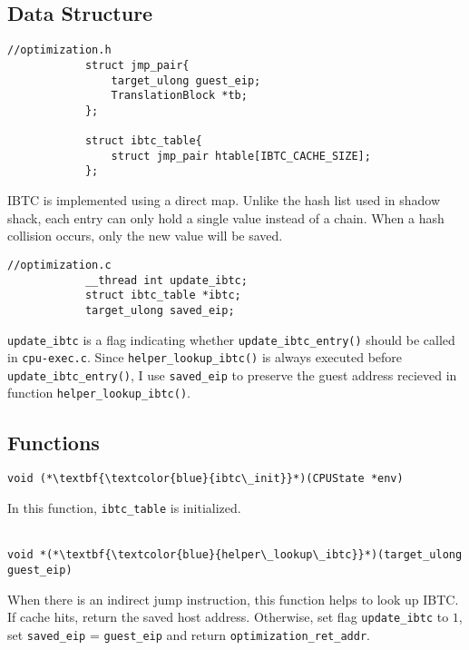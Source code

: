 \documentclass[12pt]{article}
\begin{document}
    \subsection{Data Structure}
        \begin{lstlisting}[style=Structure]
            //optimization.h
            struct jmp_pair{
                target_ulong guest_eip;
                TranslationBlock *tb;
            };

            struct ibtc_table{
                struct jmp_pair htable[IBTC_CACHE_SIZE];
            };
        \end{lstlisting}
        IBTC is implemented using a direct map.
        Unlike the hash list used in shadow shack, each entry can only hold a single value instead of a chain.
        When a hash collision occurs, only the new value will be saved.
        \\
        \begin{lstlisting}[style=Structure]
            //optimization.c
            __thread int update_ibtc;
            struct ibtc_table *ibtc;
            target_ulong saved_eip;
        \end{lstlisting}
        \verb|update_ibtc| is a flag indicating whether \verb|update_ibtc_entry()| should be called in \verb|cpu-exec.c|.
        Since \verb|helper_lookup_ibtc()| is always executed before \verb|update_ibtc_entry()|,
        I use \verb|saved_eip| to preserve the guest address recieved in function \verb|helper_lookup_ibtc()|.

    \newpage

    \subsection{Functions}
        \begin{lstlisting}[style=Function]
            void (*\textbf{\textcolor{blue}{ibtc\_init}}*)(CPUState *env)
        \end{lstlisting}
        In this function, \verb|ibtc_table| is initialized.
        \\\\
        \begin{lstlisting}[style=Function]
            void *(*\textbf{\textcolor{blue}{helper\_lookup\_ibtc}}*)(target_ulong guest_eip)
        \end{lstlisting}
        When there is an indirect jump instruction, this function helps to look up IBTC.
        If cache hits, return the saved host address.
        Otherwise, set flag \verb|update_ibtc| to $1$, set \verb|saved_eip| = \verb|guest_eip| and return \verb|optimization_ret_addr|.
\end{document}
